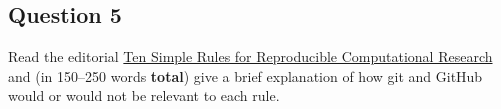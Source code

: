 \documentclass[11pt,onecolumn]{scrartcl}
\begin{document}
\subsection{Question 5}
\label{sec:org2ae8d28}

Read the editorial \href{https://doi.org/10.1371/journal.pcbi.1003285}{Ten Simple Rules for Reproducible Computational Research} and
(in 150--250 words \textbf{total}) give a brief explanation of how git and GitHub would
or would not be relevant to each rule.
\end{document}
